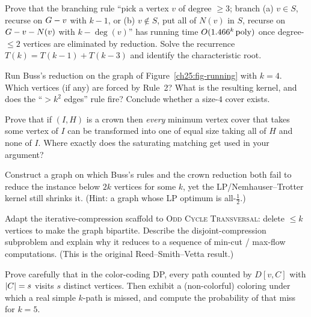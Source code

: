 \begin{exercise}
Prove that the branching rule ``pick a vertex $v$ of degree $\ge 3$; branch (a) $v\in S$, recurse on $G-v$ with $k-1$, or (b) $v\notin S$, put all of $N(v)$ in $S$, recurse on $G-v-N(v)$ with $k-\deg(v)$'' has running time $O(1.466^k\operatorname{poly})$ once degree-$\le 2$ vertices are eliminated by reduction. Solve the recurrence $T(k)=T(k-1)+T(k-3)$ and identify the characteristic root.
\end{exercise}

\begin{exercise}
Run Buss's reduction on the graph of Figure~\ref{ch25:fig-running} with $k=4$. Which vertices (if any) are forced by Rule~2? What is the resulting kernel, and does the ``$>k^2$ edges'' rule fire? Conclude whether a size-$4$ cover exists.
\end{exercise}

\begin{exercise}
Prove that if $(I,H)$ is a crown then \emph{every} minimum vertex cover that takes some vertex of $I$ can be transformed into one of equal size taking all of $H$ and none of $I$. Where exactly does the saturating matching get used in your argument?
\end{exercise}

\begin{exercise}
Construct a graph on which Buss's rules and the crown reduction both fail to reduce the instance below $2k$ vertices for some $k$, yet the LP/Nemhauser--Trotter kernel still shrinks it. (Hint: a graph whose LP optimum is all-$\tfrac12$.)
\end{exercise}

\begin{exercise}
Adapt the iterative-compression scaffold to \textsc{Odd Cycle Transversal}: delete $\le k$ vertices to make the graph bipartite. Describe the disjoint-compression subproblem and explain why it reduces to a sequence of min-cut / max-flow computations. (This is the original Reed--Smith--Vetta result.)
\end{exercise}

\begin{exercise}
Prove carefully that in the color-coding DP, every path counted by $D[v,C]$ with $\lvert C\rvert=s$ visits $s$ distinct vertices. Then exhibit a (non-colorful) coloring under which a real simple $k$-path is missed, and compute the probability of that miss for $k=5$.
\end{exercise}

